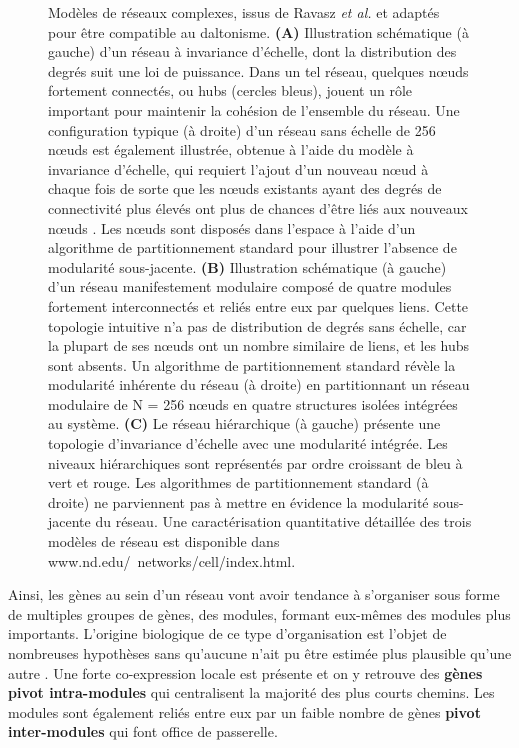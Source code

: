 \begin{figure}[hp!]
    \caption[Modèles de réseaux complexes, issus de Ravasz \textit{et al.}]{Modèles de réseaux complexes, issus de Ravasz \textit{et al.} \cite{Ravasz2002} et adaptés pour être compatible au daltonisme. \textbf{(A)} Illustration schématique (à gauche) d'un réseau à invariance d'échelle, dont la distribution des degrés suit une loi de puissance. Dans un tel réseau, quelques nœuds fortement connectés, ou hubs (cercles bleus), jouent un rôle important pour maintenir la cohésion de l'ensemble du réseau. Une configuration typique (à droite) d'un réseau sans échelle de 256 nœuds est également illustrée, obtenue à l'aide du modèle à invariance d'échelle, qui requiert l'ajout d'un nouveau nœud à chaque fois de sorte que les nœuds existants ayant des degrés de connectivité plus élevés ont plus de chances d'être liés aux nouveaux nœuds \cite{Barabasi1999Oct}. Les nœuds sont disposés dans l'espace à l'aide d'un algorithme de partitionnement standard \cite{Batagelj1998} pour illustrer l'absence de modularité sous-jacente. \textbf{(B)} Illustration schématique (à gauche) d'un réseau manifestement modulaire composé de quatre modules fortement interconnectés et reliés entre eux par quelques liens. Cette topologie intuitive n'a pas de distribution de degrés sans échelle, car la plupart de ses nœuds ont un nombre similaire de liens, et les hubs sont absents. Un algorithme de partitionnement standard révèle la modularité inhérente du réseau (à droite) en partitionnant un réseau modulaire de N = 256 nœuds en quatre structures isolées intégrées au système. \textbf{(C)} Le réseau hiérarchique (à gauche) présente une topologie d'invariance d'échelle avec une modularité intégrée. Les niveaux hiérarchiques sont représentés par ordre croissant de bleu à vert et rouge. Les algorithmes de partitionnement standard (à droite) ne parviennent pas à mettre en évidence la modularité sous-jacente du réseau. Une caractérisation quantitative détaillée des trois modèles de réseau est disponible dans www.nd.edu/~networks/cell/index.html\footnotemark.}
    \label{fig:ravasz_hierarchical_clustering}
\end{figure}

Ainsi, les gènes au sein d'un réseau vont avoir tendance à s'organiser sous forme de multiples groupes de gènes, des \glspl{module}, formant eux-mêmes des modules plus importants. L'origine biologique de ce type d'organisation est l'objet de nombreuses hypothèses sans qu'aucune n'ait pu être estimée plus plausible qu'une autre \cite{Lorenz2011}. Une forte co-expression locale est présente et on y retrouve des \textbf{gènes pivot intra-modules} qui centralisent la majorité des plus courts chemins. Les modules sont également reliés entre eux par un faible nombre de gènes \textbf{pivot inter-modules} qui font office de passerelle.

